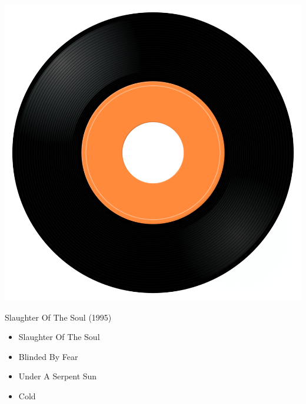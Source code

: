 \begin{minipage}[t]{0.25\textwidth}\vspace{0pt}
\captionsetup{type=figure}
\includegraphics[width=\textwidth]{Images/cover.png}
\caption*{Slaughter Of The Soul (1995)}
\end{minipage}
\begin{minipage}[t]{0.25\textwidth}\vspace{0pt}
\begin{itemize}[nosep,leftmargin=1em,labelwidth=*,align=left]
	\setlength{\itemsep}{0pt}
	\item Slaughter Of The Soul
	\item Blinded By Fear
	\item Under A Serpent Sun
	\item Cold
\end{itemize}
\end{minipage}
